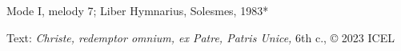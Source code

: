 

\begin{hymnsource}
Mode I, melody 7; Liber Hymnarius, Solesmes, 1983*

Text: \emph{Christe, redemptor omnium, ex Patre, Patris Unice,} 6th c., © 2023 ICEL
\end{hymnsource}
